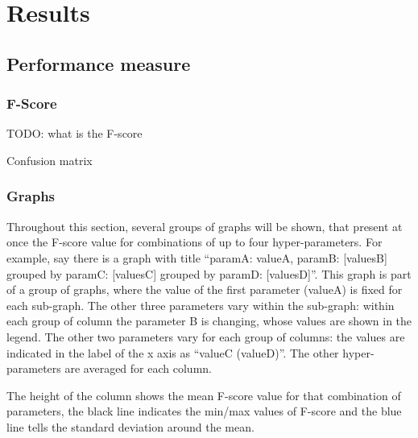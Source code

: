 
\section{Results}
\label{sec:results}

\subsection{Performance measure}

\subsubsection{F-Score}

TODO: what is the F-score

Confusion matrix

\subsubsection{Graphs}

Throughout this section, several groups of graphs will be shown, that present
at once the F-score value for combinations of up to four hyper-parameters.
For example, say there is a graph 
with title 
``paramA: valueA, paramB: [valuesB]
grouped by paramC: [valuesC]
grouped by paramD: [valuesD]''.
This graph is part of a group of graphs, where the value of the first parameter
(valueA) is fixed for each sub-graph.
The other three parameters vary within the sub-graph:
within each group of column the parameter B is changing,
whose values are shown in the legend.
The other two parameters vary for each group of columns:
the values are indicated in the label of the x axis as ``valueC (valueD)''.
The other hyper-parameters are averaged for each column.

The height of the column shows the mean F-score value for that
combination of parameters,
the black line indicates the min/max values of F-score and the
blue line tells the standard deviation around the mean.

